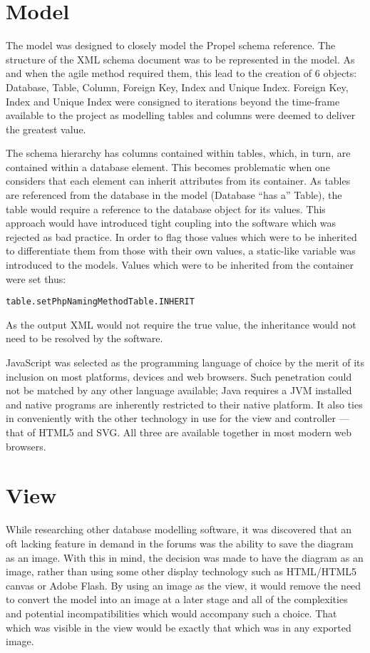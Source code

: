 \section{Model}
The model was designed to closely model the Propel schema reference. The structure of the XML schema document was to be represented in the model. As and when the agile method required them, this lead to the creation of 6 objects: Database, Table, Column, Foreign Key, Index and Unique Index. Foreign Key, Index and Unique Index were consigned to iterations beyond the time-frame available to the project as modelling tables and columns were deemed to deliver the greatest value.

The schema hierarchy has columns contained within tables, which, in turn, are contained within a database element. This becomes problematic when one considers that each element can inherit attributes from its container. As tables are referenced from the database in the model (Database ``has a'' Table), the table would require a reference to the database object for its values. This approach would have introduced tight coupling into the software which was rejected as bad practice. In order to flag those values which were to be inherited to differentiate them from those with their own values, a static-like variable was introduced to the models. Values which were to be inherited from the container were set thus:
\begin{alltt}table.setPhpNamingMethod Table.INHERIT\end{alltt}
As the output XML would not require the true value, the inheritance would not need to be resolved by the software.

JavaScript was selected as the programming language of choice by the merit of its inclusion on most platforms, devices and web browsers. Such penetration could not be matched by any other language available; Java requires a JVM installed and native programs are inherently restricted to their native platform. It also ties in conveniently with the other technology in use for the view and controller --- that of HTML5 and SVG. All three are available together in most modern web browsers.

\section{View}
While researching other database modelling software, it was discovered that an oft lacking feature in demand in the forums was the ability to save the diagram as an image. With this in mind, the decision was made to have the diagram as an image, rather than using some other display technology such as HTML\slash HTML5 canvas or Adobe Flash. By using an image as the view, it would remove the need to convert the model into an image at a later stage and all of the complexities and potential incompatibilities which would accompany such a choice. That which was visible in the view would be exactly that which was in any exported image.

